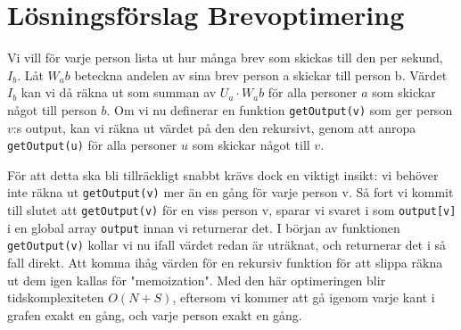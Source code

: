 \documentclass{article}
\begin{document}
\section*{Lösningsförslag Brevoptimering}

Vi vill för varje person lista ut hur många brev som skickas till den per sekund, $I_b$. Låt $W_ab$ beteckna andelen av sina brev person a skickar till person b. Värdet $I_b$ kan vi då räkna ut som summan av $U_a \cdot W_ab$ för alla personer $a$ som skickar något till person $b$. Om vi nu definerar en funktion \texttt{getOutput(v)} som ger person $v$:s output, kan vi räkna ut värdet på den den rekursivt, genom att anropa \texttt{getOutput(u)} för alla personer $u$ som skickar något till $v$.

För att detta ska bli tillräckligt snabbt krävs dock en viktigt insikt: vi behöver inte räkna ut \texttt{getOutput(v)} mer än en gång för varje person v. Så fort vi kommit till slutet att \texttt{getOutput(v)} för en viss person v, sparar vi svaret i som \texttt{output[v]} i en global array \texttt{output} innan vi returnerar det. I början av funktionen \texttt{getOutput(v)} kollar vi nu ifall värdet redan är uträknat, och returnerar det i så fall direkt. Att komma ihåg värden för en rekursiv funktion för att slippa räkna ut dem igen kallas för "memoization". Med den här optimeringen blir tidskomplexiteten $O(N+S)$, eftersom vi kommer att gå igenom varje kant i grafen exakt en gång, och varje person exakt en gång.


\end{document}
